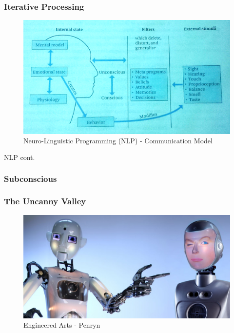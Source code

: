 \begin{frame}
	\frametitle{Iterative Processing}
	
\end{frame}


\begin{frame}
	\begin{figure}
		 \includegraphics[scale=.5]{assets/nlp}
		 \caption{ Neuro-Linguistic Programming (NLP) - Communication Model }
		 
	\end{figure}
\end{frame}

\begin{frame}
	NLP cont.
\end{frame}


\begin{frame}
	\frametitle{Subconscious}

\end{frame}


\begin{frame}
	\frametitle{The Uncanny Valley}
	\begin{figure}
		 \includegraphics[scale=.3]{assets/bots}  
		 \caption{Engineered Arts - Penryn}
	\end{figure}
\end{frame}

